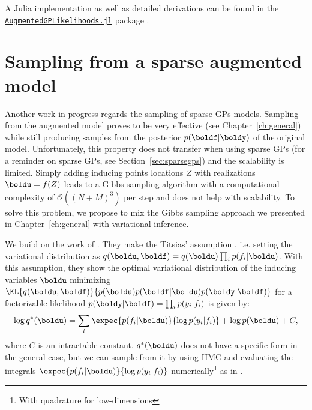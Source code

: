 A Julia implementation as well as detailed derivations can be found in the \href{https://github.com/JuliaGaussianProcesses/AugmentedGPLikelihoods.jl}{\texttt{AugmentedGPLikelihoods.jl}} package \cite{theo_galy_fajou_2022_6347022}.

\section{Sampling from a sparse augmented model}

Another work in progress regards the sampling of sparse \acp{GP} models.
Sampling from the augmented model proves to be very effective (see Chapter~\ref{ch:general}) while still producing samples from the posterior $p(\boldf|\boldy)$ of the original model.
Unfortunately, this property does not transfer when using sparse \acp{GP} (for a reminder on sparse \acp{GP}, see Section~\ref{sec:sparsegps}) and the scalability is limited.
Simply adding inducing points locations $Z$ with realizations $\boldu = f(Z)$ leads to a Gibbs sampling algorithm with a computational complexity of $\mathcal{O}((N+M)^3)$ per step and does not help with scalability.
To solve this problem, we propose to mix the Gibbs sampling approach we presented in Chapter~\ref{ch:general} with variational inference.

We build on the work of \citet{hensmanMCMCVariationallySparse2015}. 
They make the Titsias' assumption \cite{Titsias2009}, i.e. setting the variational distribution as $q(\boldu,\boldf) = q(\boldu)\prod_i p(f_i|\boldu)$.
With this assumption, they show the optimal variational distribution of the inducing variables $\boldu$ minimizing $\KL{q(\boldu, \boldf)}{p(\boldu)p(\boldf|\boldu)p(\boldy|\boldf)}$ for a factorizable likelihood $p(\boldy|\boldf)=\prod_i p(y_i|f_i)$ is given by:
\begin{align}
    \log q^*(\boldu) = \sum_{i}\expec{p(f_i|\boldu)}{\log p(y_i|f_i)} + \log p(\boldu) + C,\label{eq:obj_hensman}
\end{align}
where $C$ is an intractable constant.
$q^*(\boldu)$ does not have a specific form in the general case, but we can sample from it by using \ac{HMC} and evaluating the integrals $\expec{p(f_i|\boldu)}{\log p(y_i|f_i)}$ numerically\footnote{With quadrature for low-dimensions} as in \cite{hensmanMCMCVariationallySparse2015}.

